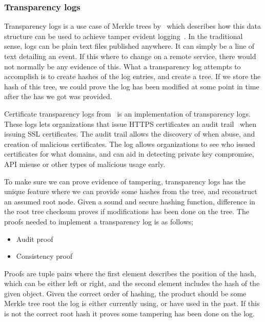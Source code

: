\documentclass[../Main/thesis.tex]{subfiles}
\begin{document}
\subsubsection*{Transparency logs}%
\label{sub:certificate_transparency_log}
Transparency logs is a use case of Merkle trees by~\citeauthor{182788} which
describes how this data structure can be used to achieve tamper evident
logging~\cite{182788}. In the traditional sense, logs can be plain text files
published anywhere. It can simply be a line of text detailing an event. If this
where to change on a remote service, there would not normally be any evidence of
this. What a transparency log attempts to accomplish is to create hashes of the
log entries, and create a tree. If we store the hash of this tree, we could
prove the log has been modified at some point in time after the has we got was
provided. 

Certificate transparency logs
from~\citeauthor{b.-laurie-a.-langley-e.kaster-google-2013} is an implementation
of transparency logs. These logs lets organizations that issue HTTPS
certificates an audit trail~\cite{b.-laurie-a.-langley-e.kaster-google-2013}
when issuing SSL certificates.  The audit trail allows the discovery of when
abuse, and creation of malicious certificates.  The log allows organizations to
see who issued certificates for what domains, and can aid in detecting private
key compromise, API misuse or other types of malicious usage early.

To make sure we can prove evidence of tampering, transparency logs has the
unique feature where we can provide some hashes from the tree, and reconstruct
an assumed root node. Given a sound and secure hashing function, difference in
the root tree checksum proves if modifications has been done on the tree.  The
proofs needed to implement a transparency log is as follows;

\begin{itemize}
\item Audit proof
\item Consistency proof
\end{itemize}

Proofs are tuple pairs where the first element describes the position of the
hash, which can be either left or right, and the second element includes the
hash of the given object. Given the correct order of hashing, the product should
be some Merkle tree root the log is either currently using, or have used in the
past. If this is not the correct root hash it proves some tampering has been
done on the log.
\end{document}
